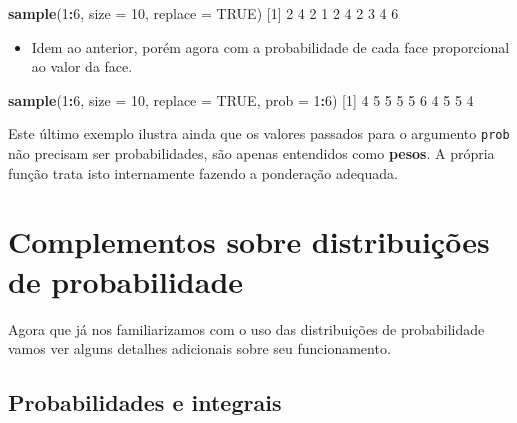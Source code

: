 \documentclass[10pt,a4paper]{book}
\newenvironment{Shaded}{\begin{snugshade}}{\end{snugshade}}
\newcommand{\KeywordTok}[1]{\textcolor[rgb]{0.13,0.29,0.53}{\textbf{#1}}}
\newcommand{\DataTypeTok}[1]{\textcolor[rgb]{0.13,0.29,0.53}{#1}}
\newcommand{\DecValTok}[1]{\textcolor[rgb]{0.00,0.00,0.81}{#1}}
\newcommand{\OtherTok}[1]{\textcolor[rgb]{0.56,0.35,0.01}{#1}}
\newcommand{\OperatorTok}[1]{\textcolor[rgb]{0.81,0.36,0.00}{\textbf{#1}}}
\newcommand{\NormalTok}[1]{#1}
\providecommand{\tightlist}{%
  \setlength{\itemsep}{0pt}\setlength{\parskip}{0pt}}
\begin{document}
\begin{Shaded}
\begin{Highlighting}[]
\KeywordTok{sample}\NormalTok{(}\DecValTok{1}\OperatorTok{:}\DecValTok{6}\NormalTok{, }\DataTypeTok{size =} \DecValTok{10}\NormalTok{, }\DataTypeTok{replace =} \OtherTok{TRUE}\NormalTok{)}
\NormalTok{ [}\DecValTok{1}\NormalTok{] }\DecValTok{2} \DecValTok{4} \DecValTok{2} \DecValTok{1} \DecValTok{2} \DecValTok{4} \DecValTok{2} \DecValTok{3} \DecValTok{4} \DecValTok{6}
\end{Highlighting}
\end{Shaded}

\begin{itemize}
\tightlist
\item
  Idem ao anterior, porém agora com a probabilidade de cada face
  proporcional ao valor da face.
\end{itemize}

\begin{Shaded}
\begin{Highlighting}[]
\KeywordTok{sample}\NormalTok{(}\DecValTok{1}\OperatorTok{:}\DecValTok{6}\NormalTok{, }\DataTypeTok{size =} \DecValTok{10}\NormalTok{, }\DataTypeTok{replace =} \OtherTok{TRUE}\NormalTok{,  }\DataTypeTok{prob =} \DecValTok{1}\OperatorTok{:}\DecValTok{6}\NormalTok{)}
\NormalTok{ [}\DecValTok{1}\NormalTok{] }\DecValTok{4} \DecValTok{5} \DecValTok{5} \DecValTok{5} \DecValTok{5} \DecValTok{6} \DecValTok{4} \DecValTok{5} \DecValTok{5} \DecValTok{4}
\end{Highlighting}
\end{Shaded}

Este último exemplo ilustra ainda que os valores passados para o
argumento \texttt{prob} não precisam ser probabilidades, são apenas
entendidos como \textbf{pesos}. A própria função trata isto internamente
fazendo a ponderação adequada.

\section{Complementos sobre distribuições de
probabilidade}\label{complementos-sobre-distribuicoes-de-probabilidade}

Agora que já nos familiarizamos com o uso das distribuições de
probabilidade vamos ver alguns detalhes adicionais sobre seu
funcionamento.

\subsection{Probabilidades e
integrais}\label{probabilidades-e-integrais}
\end{document}
